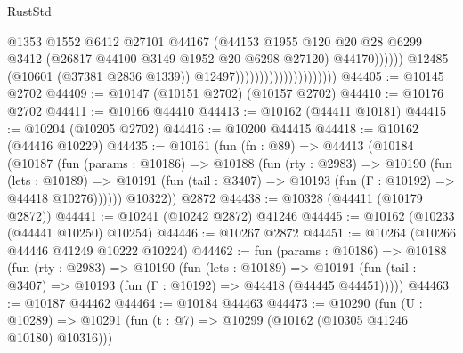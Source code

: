 \begin{lexlean}{RustStd}
\begin{coremodule}
                                                        @1353
                                                        @1552
                                                        @6412
                                                        @27101
                                                        @44167
                                                        (@44153
                                                          @1955
                                                          @120
                                                          @20
                                                          @28
                                                          @6299
                                                          @3412
                                                          (@26817
                                                            @44100
                                                            @3149
                                                            @1952
                                                            @20
                                                            @6298
                                                            @27120)
                                                          @44170))))))
                                              @12485
                                              (@10601 (@37381 @2836 @1339))
                                              @12497)))))))))))))))))))))
@44405 := @10145 @2702
@44409 := @10147 (@10151 @2702) (@10157 @2702)
@44410 := @10176 @2702
@44411 := @10166 @44410
@44413 := @10162 (@44411 @10181)
@44415 := @10204 (@10205 @2702)
@44416 := @10200 @44415
@44418 := @10162 (@44416 @10229)
@44435 := @10161
    (fun (fn : @89) =>
    @44413
      (@10184
        (@10187
          (fun (params : @10186) =>
          @10188
            (fun (rty : @2983) =>
            @10190
              (fun (lets : @10189) =>
              @10191 (fun (tail : @3407) => @10193 (fun (Γ : @10192) => @44418 @10276))))))
        @10322))
    @2872
@44438 := @10328 (@44411 (@10179 @2872))
@44441 := @10241 (@10242 @2872) @41246
@44445 := @10162 (@10233 (@44441 @10250) @10254)
@44446 := @10267 @2872
@44451 := @10264 (@10266 @44446 @41249 @10222 @10224)
@44462 := fun (params : @10186) =>
  @10188
    (fun (rty : @2983) =>
    @10190
      (fun (lets : @10189) =>
      @10191 (fun (tail : @3407) => @10193 (fun (Γ : @10192) => @44418 (@44445 @44451)))))
@44463 := @10187 @44462
@44464 := @10184 @44463
@44473 := @10290
    (fun (U : @10289) => @10291 (fun (t : @7) => @10299 (@10162 (@10305 @41246 @10180) @10316)))

\end{coremodule}
\end{lexlean}
